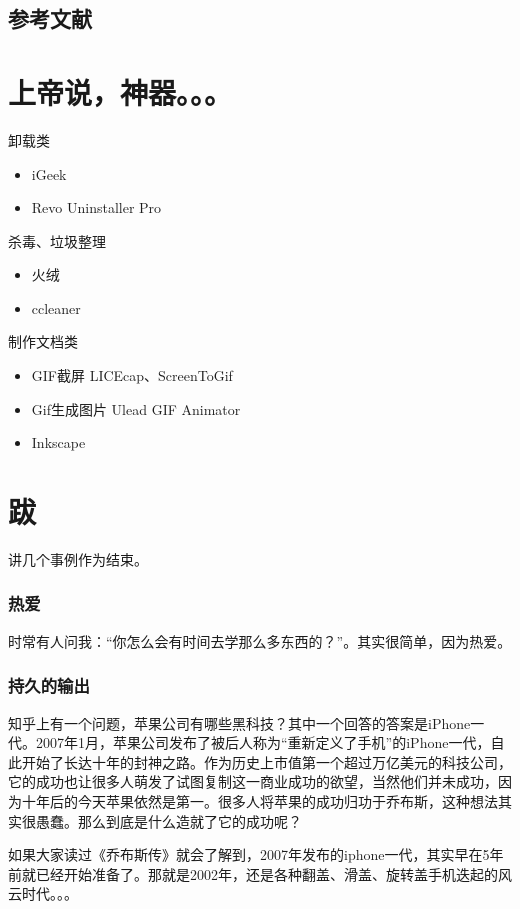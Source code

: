 \documentclass[UTF8]{ctexbook}
\begin{document}
\section{参考文献}


\chapter{上帝说，神器。。。}
\noindent 卸载类
\begin{itemize}
	\item iGeek
	\item Revo Uninstaller Pro
\end{itemize}
杀毒、垃圾整理
\begin{itemize}
	\item 火绒
	\item ccleaner
\end{itemize}
制作文档类
\begin{itemize}
	\item GIF截屏 LICEcap、ScreenToGif
	\item Gif生成图片 Ulead GIF Animator
	\item Inkscape
\end{itemize}

\backmatter
\chapter*{跋}
讲几个事例作为结束。

\subsection*{热爱}
时常有人问我：“你怎么会有时间去学那么多东西的？”。其实很简单，因为热爱。

\subsection*{持久的输出}
知乎上有一个问题，苹果公司有哪些黑科技？其中一个回答的答案是iPhone一代。2007年1月，苹果公司发布了被后人称为“重新定义了手机”的iPhone一代，自此开始了长达十年的封神之路。作为历史上市值第一个超过万亿美元的科技公司，它的成功也让很多人萌发了试图复制这一商业成功的欲望，当然他们并未成功，因为十年后的今天苹果依然是第一。很多人将苹果的成功归功于乔布斯，这种想法其实很愚蠢。那么到底是什么造就了它的成功呢？

如果大家读过《乔布斯传》就会了解到，2007年发布的iphone一代，其实早在5年前就已经开始准备了。那就是2002年，还是各种翻盖、滑盖、旋转盖手机迭起的风云时代。。。
\end{document}
